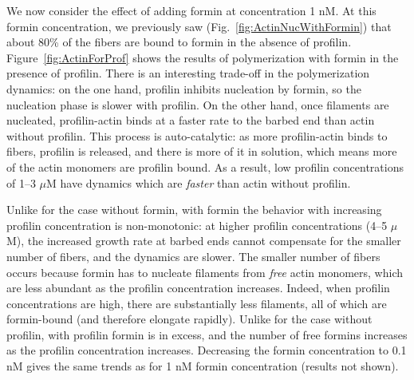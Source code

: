 \documentclass[11pt]{article}
\begin{document}
\iffalse
\begin{figure}
\centering
\texttt{[image: LengthHistsForminProf.eps]}
\caption{\label{fig:HistsForProf}Length distribution for actin filaments in simulations with 1 nM formin and varying concentrations of profilin. We show the distributions of fiber sizes (in terms of the number of monomers) at four time points ($t=300$ s in blue, $t=600$ s in red, $t=1800$ s in yellow, and $t=5400$ s in purple). Increasing profilin concentration gives less filaments, which translates to a more uniform-looking distribution with larger mean and standard deviation.}
\end{figure}
\fi


We now consider the effect of adding formin at concentration 1 nM. At this formin concentration, we previously saw (Fig.\ \ref{fig:ActinNucWithFormin}) that about 80\% of the fibers are bound to formin in the absence of profilin. Figure\ \ref{fig:ActinForProf} shows the results of polymerization with formin in the presence of profilin. There is an interesting trade-off in the polymerization dynamics: on the one hand, profilin inhibits nucleation by formin, so the nucleation phase is slower with profilin. On the other hand, once filaments are nucleated, profilin-actin binds at a faster rate to the barbed end than actin without profilin. This process is auto-catalytic: as more profilin-actin binds to fibers, profilin is released, and there is more of it in solution, which means more of the actin monomers are profilin bound. As a result, low profilin concentrations of 1--3 $\mu$M have dynamics which are \emph{faster} than actin without profilin.


Unlike for the case without formin, with formin the behavior with increasing profilin concentration is non-monotonic: at higher profilin concentrations (4--5 $\mu$M), the increased growth rate at barbed ends cannot compensate for the smaller number of fibers, and the dynamics are slower. The smaller number of fibers occurs because formin has to nucleate filaments from \emph{free} actin monomers, which are less abundant as the profilin concentration increases. Indeed, when profilin concentrations are high, there are substantially less filaments, all of which are formin-bound (and therefore elongate rapidly). Unlike for the case without profilin, with profilin formin is in excess, and the number of free formins increases as the profilin concentration increases. Decreasing the formin concentration to 0.1 nM gives the same trends as for 1 nM formin concentration (results not shown). 
\end{document}
